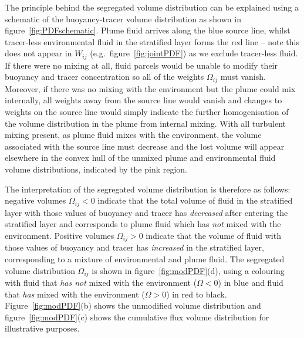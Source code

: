 \documentclass[a4paper]{article}
\begin{document}
The principle behind the segregated volume distribution can be explained using a schematic of the
buoyancy-tracer volume distribution as shown in figure~\ref{fig:PDFschematic}. Plume fluid arrives along the
blue source line, whilst tracer-less environmental fluid in the stratified layer forms the red line -- note
this does not appear in $W_{ij}$ (e.g.\ figure~\ref{fig:jointPDF}) as we exclude tracer-less fluid. If there
were no mixing at all, fluid parcels would be unable to modify their buoyancy and tracer concentration so all
of the weights $\Omega_{ij}$ must vanish.  Moreover, if there was no mixing with the environment but the plume
could mix internally, all weights away from the source line would vanish and changes to weights on the source
line would simply indicate the further homogenisation of the volume distribution in the plume from internal
mixing. With all turbulent mixing present, as plume fluid mixes with the environment, the volume associated
with the source line must decrease and the lost volume will appear elsewhere in the convex hull of the unmixed
plume and environmental fluid volume distributions, indicated by the pink region. 

The interpretation of the segregated volume distribution is therefore as follows: negative volumes
$\Omega_{ij} < 0$ indicate that the total volume of fluid in the stratified layer with those values of
buoyancy and tracer has \emph{decreased} after entering the stratified layer and corresponds to plume fluid
which has \emph{not} mixed with the environment.  Positive volumes $\Omega_{ij} > 0$ indicate that the volume
of fluid with those values of buoyancy and tracer has \emph{increased} in the stratified layer, corresponding
to a mixture of environmental and plume fluid. The segregated volume distribution $\Omega_{ij}$ is shown in
figure~\ref{fig:modPDF}(d), using a colouring with fluid that \emph{has not} mixed with the environment
($\Omega < 0$) in blue and fluid that \emph{has} mixed with the environment ($\Omega > 0$) in red to black.
Figure~\ref{fig:modPDF}(b) shows the unmodified volume distribution and figure~\ref{fig:modPDF}(c) shows the
cumulative flux volume distribution for illustrative purposes.
\end{document}
